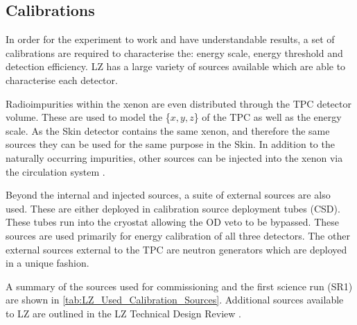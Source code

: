 \subsection{Calibrations}
\label{sec:lz_calibrations}
\par
In order for the experiment to work and have understandable results, a set of calibrations are required to characterise the: energy scale, energy threshold and detection efficiency.
LZ has a large variety of sources available which are able to characterise each detector.
\par
Radioimpurities within the xenon are even distributed through the TPC detector volume.
These are used to model the \{$x,y,z$\} of the TPC as well as the energy scale.
As the Skin detector contains the same xenon, and therefore the same sources they can be used for the same purpose in the Skin.
In addition to the naturally occurring impurities, other sources can be injected into the xenon via the circulation system \cite{christophernedlik_thesis_ref}.
\par
Beyond the internal and injected sources, a suite of external sources are also used.
These are either deployed in calibration source deployment tubes (CSD).
These tubes run into the cryostat allowing the OD veto to be bypassed.
These sources are used primarily for energy calibration of all three detectors.
The other external sources external to the TPC are neutron generators which are deployed in a unique fashion.
\par
A summary of the sources used for commissioning and the first science run (SR1) are shown in \autoref{tab:LZ_Used_Calibration_Sources}.
Additional sources available to LZ are outlined in the LZ Technical Design Review \cite{LZ_TechnicalDesignReview_ref}.

